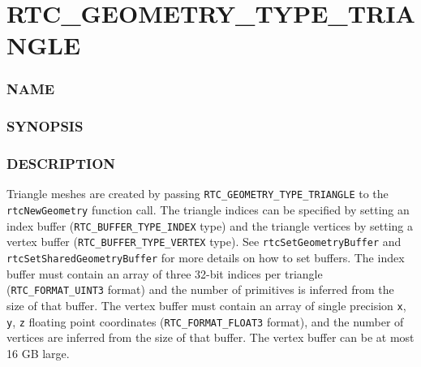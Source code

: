 \pagebreak

\section{RTC\_GEOMETRY\_TYPE\_TRIANGLE}\label{rtc_geometry_type_triangle}

\subsubsection{NAME}\label{name}

\begin{Shaded}
\begin{Highlighting}[]
\OperatorTok{{-}}
\end{Highlighting}
\end{Shaded}

\subsubsection{SYNOPSIS}\label{synopsis}

\begin{Shaded}
\begin{Highlighting}[]

\OperatorTok{=}
\OperatorTok{(}\OperatorTok{,}\OperatorTok{);}
\end{Highlighting}
\end{Shaded}

\subsubsection{DESCRIPTION}\label{description}

Triangle meshes are created by passing
\texttt{RTC\_GEOMETRY\_TYPE\_TRIANGLE} to the \texttt{rtcNewGeometry}
function call. The triangle indices can be specified by setting an index
buffer (\texttt{RTC\_BUFFER\_TYPE\_INDEX} type) and the triangle
vertices by setting a vertex buffer (\texttt{RTC\_BUFFER\_TYPE\_VERTEX}
type). See \texttt{rtcSetGeometryBuffer} and
\texttt{rtcSetSharedGeometryBuffer} for more details on how to set
buffers. The index buffer must contain an array of three 32-bit indices
per triangle (\texttt{RTC\_FORMAT\_UINT3} format) and the number of
primitives is inferred from the size of that buffer. The vertex buffer
must contain an array of single precision \texttt{x}, \texttt{y},
\texttt{z} floating point coordinates (\texttt{RTC\_FORMAT\_FLOAT3}
format), and the number of vertices are inferred from the size of that
buffer. The vertex buffer can be at most 16 GB large.

